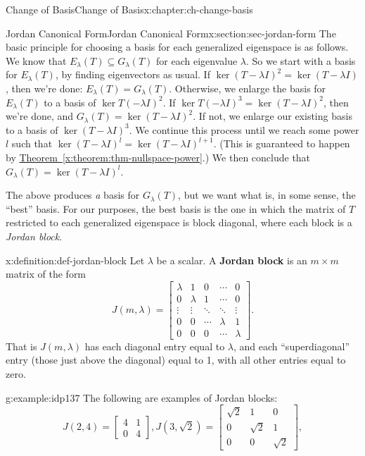 \documentclass[oneside,10pt,]{book}
\newcommand{\xreffont}{\relax}
\newcommand{\terminology}[1]{\textbf{#1}}
\numberwithin{equation}{section}
\newcommand{\bbm}{\begin{bmatrix}}
\newcommand{\ebm}{\end{bmatrix}}
\newcommand{\amp}{&}
\begin{document}
\begin{chapterptx}{Change of Basis}{}{Change of Basis}{}{}{x:chapter:ch-change-basis}
\begin{sectionptx}{Jordan Canonical Form}{}{Jordan Canonical Form}{}{}{x:section:sec-jordan-form}
The basic principle for choosing a basis for each generalized eigenspace is as follows. We know that \(E_{\lambda}(T)\subseteq G_\lambda(T)\) for each eigenvalue \(\lambda\). So we start with a basis for \(E_\lambda(T)\), by finding eigenvectors as usual. If \(\ker (T-\lambda I)^2 = \ker (T-\lambda I)\), then we're done: \(E_\lambda(T)=G_\lambda(T)\). Otherwise, we enlarge the basis for \(E_\lambda(T)\) to a basis of \(\ker T(-\lambda I)^2\). If \(\ker T(-\lambda I)^3=\ker (T-\lambda I)^2\), then we're done, and \(G_\lambda(T) = \ker (T-\lambda I)^2\). If not, we enlarge our existing basis to a basis of \(\ker (T-\lambda I)^3\). We continue this process until we reach some power \(l\) such that \(\ker (T-\lambda I)^l = \ker (T-\lambda I)^{l+1}\). (This is guaranteed to happen by \hyperref[x:theorem:thm-nullspace-power]{Theorem~{\xreffont\ref{x:theorem:thm-nullspace-power}}}.) We then conclude that \(G_\lambda(T) = \ker (T-\lambda I)^l\).%
\par
The above produces \emph{a} basis for \(G_\lambda(T)\), but we want what is, in some sense, the ``best'' basis. For our purposes, the best basis is the one in which the matrix of \(T\) restricted to each generalized eigenspace is block diagonal, where each block is a \emph{Jordan block}.%
\begin{definition}{}{x:definition:def-jordan-block}%
Let \(\lambda\) be a scalar. A \terminology{Jordan block} is an \(m\times m\) matrix of the form%
\begin{equation*}
J(m,\lambda) = \bbm \lambda \amp 1 \amp 0 \amp \cdots \amp 0\\
0 \amp \lambda \amp 1 \amp \cdots \amp 0\\
\vdots \amp \vdots \amp \ddots \amp \ddots \amp \vdots\\
0 \amp 0 \amp \cdots \amp \lambda \amp 1\\
0 \amp 0 \amp 0 \amp \cdots \amp \lambda\ebm\text{.}
\end{equation*}
That is \(J(m,\lambda)\) has each diagonal entry equal to \(\lambda\), and each ``superdiagonal'' entry (those just above the diagonal) equal to 1, with all other entries equal to zero.%
\end{definition}
\begin{example}{}{g:example:idp137}%
The following are examples of Jordan blocks:%
\begin{equation*}
J(2,4)=\bbm 4 \amp 1\\ 0\amp 4\ebm, J(3,\sqrt{2})=\bbm \sqrt{2} \amp 1\amp 0\\0\amp \sqrt{2}\amp 1\\0\amp 0\amp \sqrt{2}\ebm,

\end{equation*}
\end{example}
\end{sectionptx}
\end{chapterptx}
\end{document}
